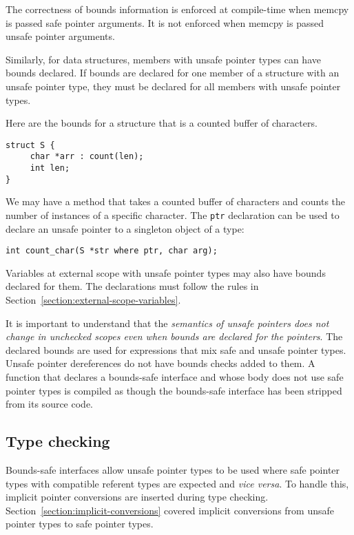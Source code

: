 The correctness of bounds information is enforced at compile-time when
memcpy is passed safe pointer arguments. It is not enforced when memcpy
is passed unsafe pointer arguments.

Similarly, for data structures, members with unsafe pointer types can
have bounds declared. If bounds are declared for one member of a
structure with an unsafe pointer type, they must be declared for all
members with unsafe pointer types.

Here are the bounds for a structure that is a counted buffer of
characters.
\begin{verbatim}
struct S {
     char *arr : count(len);
     int len;
}
\end{verbatim}

We may have a method that takes a counted buffer of characters and
counts the number of instances of a specific character. The \texttt{ptr}
declaration can be used to declare an unsafe pointer to a singleton
object of a type:
\begin{verbatim}
int count_char(S *str where ptr, char arg);
\end{verbatim}

Variables at external scope with unsafe pointer types may also have 
bounds declared for them.   The declarations must follow the 
rules in Section~\ref{section:external-scope-variables}.

It is important to understand that the \emph{semantics of unsafe
pointers does not change in unchecked scopes even when bounds are
declared for the pointers}. The declared bounds are used  for expressions
that mix safe and unsafe pointer types. Unsafe pointer dereferences do not
have bounds checks added to them. A function that declares a bounds-safe 
interface and whose body does not use safe pointer
types is compiled as though the bounds-safe interface has been
stripped from its source code.

\subsection{Type checking}

Bounds-safe interfaces allow unsafe pointer types to be used
where safe pointer types with compatible referent types are expected
and {\it vice versa}.
To handle this, implicit pointer conversions are inserted during type checking.
Section~\ref{section:implicit-conversions} covered implicit conversions from unsafe pointer types to safe pointer types.

